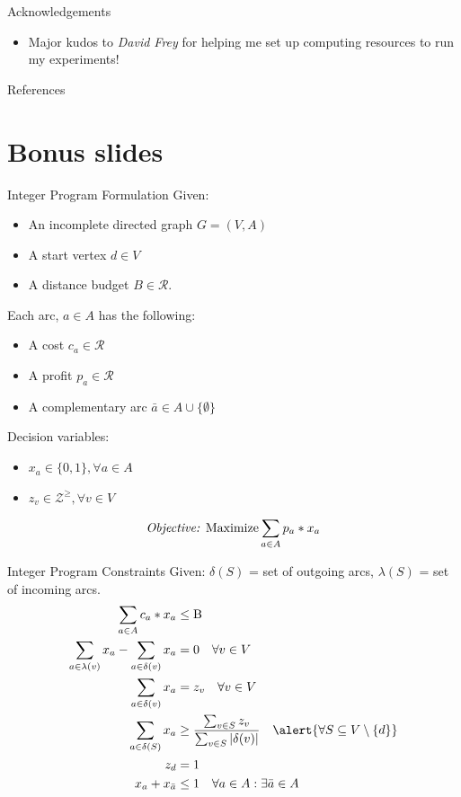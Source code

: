 \documentclass{beamer}
\newcommand{\RR}{\mathcal{R}} %
\newcommand{\ZZ}{\mathcal{Z}} %
\newcommand{\set}[1]{\ensuremath{\{{#1}\}}} %
\newcommand{\sse}{\subseteq} %
\begin{document}
\begin{frame}{Acknowledgements}
\begin{itemize}
    \item Major kudos to \emph{David Frey} for helping me set up computing resources to run my experiments!
\end{itemize}
\end{frame}

\begin{frame}{References}
    \nocite{*}
    \scriptsize
    
    
\end{frame}

\section{Bonus slides}

\appendix   
\begin{frame}{Integer Program Formulation \cite{verbeeck2014extension}}
Given:
\begin{itemize}
    \item An incomplete directed graph $G = (V,A)$
    \item A start vertex $d \in V$
    \item A distance budget $B \in \RR$.
\end{itemize}
Each arc, $a \in A$ has the following:
\begin{itemize}
    \item A cost $c_a \in \RR$
    \item A profit $p_a \in \RR$
    \item A complementary arc $\bar{a} \in A  \cup \set{\emptyset}$
\end{itemize} 

Decision variables:
\begin{itemize}
    \item $x_a \in \set{0,1},  \forall a \in A$
    \item $z_v \in \ZZ^{\geq}, \forall v \in V$
\end{itemize}
\begin{equation}
    \text{\emph{Objective:} Maximize} \sum_{a \in A}{p_a * x_a}    
\end{equation}
\end{frame}

\begin{frame}{Integer Program Constraints}
Given: $\delta(S)$ = set of outgoing arcs, $\lambda(S)$ = set of incoming arcs.
\begin{align}
    \sum_{a \in A}{c_a * x_a} &\leq \text{B}\\
    \sum_{a \in \lambda(v)}{x_a}  -\sum_{a \in \delta(v)}{x_a} &= 0 \quad \forall v \in V\\
    \sum_{a \in \delta(v)}{x_a} &= z_v \quad\forall v \in V\\
    \sum_{a \in \delta(S)}{x_a} &\geq \frac{\sum_{v \in S}{z_v}}{\sum_{v \in S}{|\delta(v)|}} \quad \alert{\forall S \sse V \setminus \set{d}}\\
    z_d &= 1\\
    x_a + x_{\bar{a}} &\leq 1 \quad \forall a \in A: \exists\bar{a} \in A
\end{align} 
\end{frame}
\end{document}
